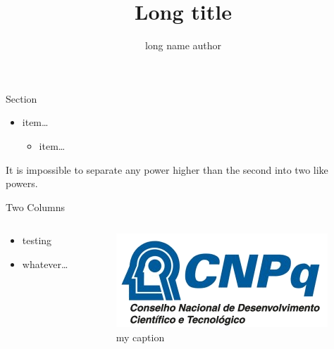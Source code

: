\documentclass[xcolor=pdftex,dvipsnames,aspectratio=169]{beamer}
\title[short title]{Long title}
\author[short name author]{ long name author} \institute[short institute]{long institute  \href{mailto:mail@mail.com}{mail (at) mail (dot) com }}
\begin{document}
\begin{frame}
	\maketitle
\end{frame}

\begin{frame}{Section}
\begin{itemize}
\item item\ldots
\begin{itemize}
	\item item\ldots
\end{itemize}
\end{itemize}

\begin{theorem}
It is impossible to separate any power higher than the second into two like powers.
\end{theorem}

\end{frame}

\begin{frame}{Two Columns}
    \begin{columns}[c] %
    \begin{column}[c]{.5\textwidth} %
    	\begin{itemize}
  		\item testing
  		\item whatever\ldots
		\end{itemize}
    \end{column}
    \begin{column}[c]{.5\textwidth} %
		\begin{figure}
		\centering
		\captionsetup{justification=centering}
		\includegraphics[width=.5\textwidth]{logos/cnpq_logo.png}
		\caption{my caption \cite{aReference}}
		\end{figure}
    \end{column}
    \end{columns}

\end{frame}
\end{document}
